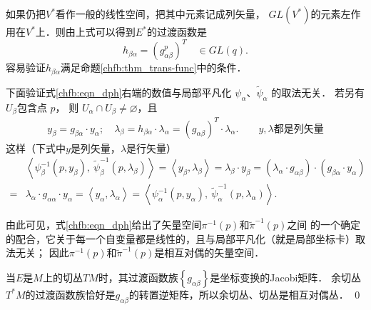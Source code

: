 如果仍把$V^*$看作一般的线性空间，把其中元素记成列矢量，
$GL(V^*)$的元素左作用在$V^*$上．则由上式可以得到$E^*$的过渡函数是
\begin{equation}
    h_{\beta\alpha}= (g^p_{\alpha\beta})^T \quad \in GL(q).
\end{equation}
容易验证$h_{\beta\alpha}$满足命题\ref{chfb:thm_trans-func}中的条件．

下面验证式\eqref{chfb:eqn_dph}右端的数值与局部平凡化 $\psi_\alpha$、$\tilde{\psi}_\alpha$ 的取法无关． 
若另有$U_\beta$包含点 $p$， 则 $U_\alpha \cap U_\beta \neq \varnothing$，且
\begin{align*}
    y_\beta=g_{\beta\alpha} \cdot y_\alpha; \quad
    \lambda_\beta=h_{\beta\alpha}\cdot \lambda_\alpha = (g_{\alpha\beta})^T\cdot \lambda_\alpha .
    \qquad y,\lambda \text{都是列矢量}
\end{align*}
这样（下式中$y$是列矢量，$\lambda$是行矢量）
\begin{align*}
    &\left\langle\psi_\beta^{-1} (p, y_\beta),\ \tilde{\psi}_\beta^{-1} (p, \lambda_\beta )\right\rangle
    = \left\langle y_\beta, \lambda_\beta\right\rangle 
    =  \lambda_\beta \cdot y_\beta = (\lambda_\alpha \cdot g_{\alpha\beta})\cdot (g_{\beta\alpha} \cdot y_\alpha) \\
    =& \lambda_\alpha \cdot  g_{\alpha\alpha}\cdot  y_\alpha =  \left\langle y_\alpha, \lambda_\alpha \right\rangle
    =\left\langle\psi_\alpha^{-1} (p, y_\alpha),\ \tilde{\psi}_\alpha^{-1} (p, \lambda_\alpha )\right\rangle. 
\end{align*}

由此可见，式\eqref{chfb:eqn_dph}给出了矢量空间$\pi^{-1}(p)$和$\tilde{\pi}^{-1}(p)$之间
的一个确定的配合，它关于每一个自变量都是线性的，且与局部平凡化（就是局部坐标卡）取法无关；
因此$\pi^{-1}(p)$和$\tilde{\pi}^{-1}(p)$是相互对偶的矢量空间．

当$E$是$M$上的切丛$TM$时，其过渡函数族$\left\{g_{\alpha\beta}\right\}$是坐标变换的Jacobi矩阵．
余切丛$T^*M$的过渡函数族恰好是$g_{\alpha\beta}$的转置逆矩阵，所以余切丛、切丛是相互对偶丛．
\qed




